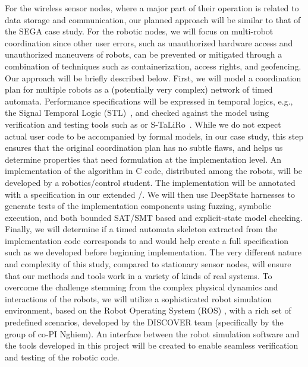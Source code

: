   For the wireless sensor nodes, where a major part of their operation is related to data storage and communication, our planned approach will be similar to that of the SEGA case study.
  For the robotic nodes, we will focus on multi-robot coordination since other user errors, such as unauthorized hardware access and unauthorized maneuvers of robots, can be prevented or mitigated through a combination of techniques such as containerization, access rights, and geofencing.
  Our approach will be briefly described below.
  First, we will model a coordination plan %
  for multiple robots as a (potentially very complex) network of timed automata.
  Performance specifications will be expressed in temporal logics, e.g., the Signal Temporal Logic (STL)~\cite{donze2010robust}, and checked against the model using verification and testing tools such as \uppaal or S-TaLiRo~\cite{annpureddy2011s}.
  While we do not expect actual user code to be accompanied by formal models, in our case study, this step ensures that the original coordination plan has no subtle flaws, and helps us determine properties that need formulation at the implementation level.
  An implementation of the algorithm in C code, distributed among the robots, will be developed by a robotics/control student.
  The implementation will be annotated with a specification in our extended \acsl/\eacsl.
  We will then use DeepState harnesses to generate tests of the implementation components using fuzzing, symbolic execution, and both bounded SAT/SMT based and explicit-state model checking.
  Finally, we will determine if a timed automata skeleton extracted from the implementation code corresponds to and would help create a full specification such as we developed before beginning implementation.
  The very different nature and complexity of this study, compared to stationary sensor nodes, will ensure that our methods and tools work in a variety of kinds of real systems.
  To overcome the challenge stemming from the complex physical dynamics and interactions of the robots, we will utilize a sophisticated robot simulation environment, based on the Robot Operating System (ROS) \cite{ROS}, with a rich set of predefined scenarios, developed by the DISCOVER team (specifically by the group of co-PI Nghiem).
  An interface between the robot simulation software and the tools developed in this project will be created to enable seamless verification and testing of the robotic code.


